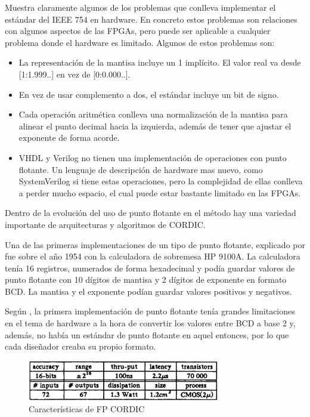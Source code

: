 \cite{parker_abstract_2011} Muestra claramente algunos de los problemas que conlleva implementar el estándar del IEEE 754 en hardware. En concreto estos problemas son relaciones con algunos aspectos de las FPGAs, pero puede ser aplicable a cualquier problema donde el hardware es limitado. Algunos de estos problemas son:

\begin{itemize}
	\item La representación de la mantisa incluye un 1 implícito. El valor real va desde [1:1.999..] en vez de [0:0.000..]. 
	\item En vez de usar complemento a dos, el estándar incluye un bit de signo.
	\item Cada operación aritmética conlleva una normalización de la mantisa para alinear el punto decimal hacia la izquierda, además de tener que ajustar el exponente de forma acorde.
	\item VHDL y Verilog no tienen una implementación de operaciones con punto flotante. Un lenguaje de descripción de hardware mas nuevo, como SystemVerilog si tiene estas operaciones, pero la complejidad de ellas conlleva a perder mucho espacio, el cual puede estar bastante limitado en las FPGAs.
\end{itemize}

Dentro de la evolución del uso de punto flotante en el método hay una variedad importante de arquitecturas y algoritmos de CORDIC.

Una de las primeras implementaciones de un tipo de punto flotante, explicado por \cite{leibson_9100_2005} fue sobre el año 1954 con la calculadora de sobremesa HP 9100A. La calculadora tenía 16 registros, numerados de forma hexadecimal y podía guardar valores de punto flotante con 10 dígitos de mantisa y 2 dígitos de exponente en formato BCD. La mantisa y el exponente podían guardar valores positivos y negativos.

Según \cite{walther_unified_1971}, la primera implementación de punto flotante tenía grandes limitaciones en el tema de hardware a la hora de convertir los valores entre BCD a base 2 y, además, no había un estándar de punto flotante en aquel entonces, por lo que cada diseñador creaba su propio formato.

\begin{figure}[ht]
	\centering
	\includegraphics[width=0.75\textwidth]{archivos/CORDIC/1988_CORDIC_chip_features.png}
	\caption{Características de FP CORDIC}
	\label{graf:FP_CORDIC_features}
\end{figure}

